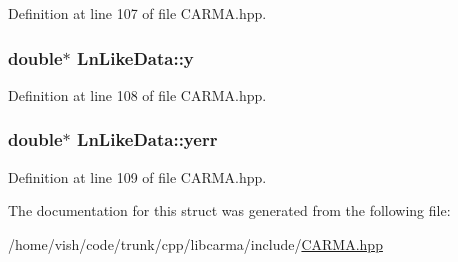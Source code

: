 Definition at line 107 of file C\-A\-R\-M\-A.\-hpp.

\hypertarget{struct_ln_like_data_ac75cc1e68fffac23d841e09f927a0a53}{
\subsubsection[{y}]{\setlength{\rightskip}{0pt plus 5cm}double$\ast$ Ln\-Like\-Data\-::y}}\label{struct_ln_like_data_ac75cc1e68fffac23d841e09f927a0a53}


Definition at line 108 of file C\-A\-R\-M\-A.\-hpp.

\hypertarget{struct_ln_like_data_a54330ef049f623a902d04f58e5aee208}{
\subsubsection[{yerr}]{\setlength{\rightskip}{0pt plus 5cm}double$\ast$ Ln\-Like\-Data\-::yerr}}\label{struct_ln_like_data_a54330ef049f623a902d04f58e5aee208}


Definition at line 109 of file C\-A\-R\-M\-A.\-hpp.



The documentation for this struct was generated from the following file\-:\begin{DoxyCompactItemize}
\item 
/home/vish/code/trunk/cpp/libcarma/include/\hyperlink{_c_a_r_m_a_8hpp}{C\-A\-R\-M\-A.\-hpp}\end{DoxyCompactItemize}
